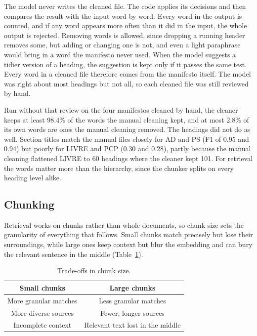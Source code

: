 The model never writes the cleaned file. The code applies its decisions and
then compares the result with the input word by word. Every word in the
output is counted, and if any word appears more often than it did in the
input, the whole output is rejected. Removing words is allowed, since dropping
a running header removes some, but adding or changing one is not, and even a
light paraphrase would bring in a word the manifesto never used. When the
model suggests a tidier version of a heading, the suggestion is kept only if
it passes the same test. Every word in a cleaned file therefore comes from the
manifesto itself. The model was right about most headings but not all, so each
cleaned file was still reviewed by hand.

Run without that review on the four manifestos cleaned
by hand, the cleaner keeps at least 98.4\% of the words the manual cleaning
kept, and at most 2.8\% of its own words are ones the manual cleaning removed.
The headings did not do as well. Section titles match the manual files closely
for AD and PS (F1 of 0.95 and 0.94) but poorly for LIVRE and PCP (0.30 and
0.28), partly because the manual cleaning flattened LIVRE to 60 headings where
the cleaner kept 101. For retrieval the words matter more than the
hierarchy, since the chunker splits on every heading level alike.

\subsection{Chunking} \label{subsec:chunking}

Retrieval works on chunks rather than whole documents, so chunk size sets the
granularity of everything that follows. Small chunks match precisely but lose
their surroundings, while large ones keep context but blur the embedding and
can bury the relevant sentence in the middle (Table~\ref{tab:chunk-sizes}).

\begin{table}[H]
    \centering
    \begin{tabular}{|c|c|}
        \hline
        \textbf{Small chunks} & \textbf{Large chunks}\\
        \hline
        More granular matches & Less granular matches \\
        More diverse sources & Fewer, longer sources \\
        Incomplete context & Relevant text lost in the middle \\
        \hline
    \end{tabular}
    \caption{Trade-offs in chunk size.}
    \label{tab:chunk-sizes}
\end{table}

